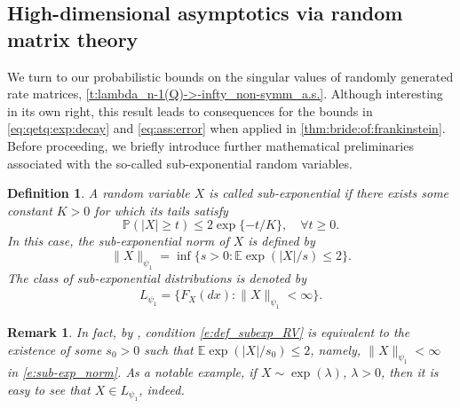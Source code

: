\documentclass[9pt,twocolumn,twoside]{pnas-new}
\makeatletter
\newcommand{\bbP}{{\mathbb P}}
\newcommand{\bbE}{{\mathbb E}}
\newcommand{\?}{\textbf{?}}
\newtheorem{@definition}{\bf Definition}
\newenvironment{definition}{\begin{@definition}\rm}{\end{@definition}}
\newtheorem{@remark}{\bf Remark}
\newenvironment{remark}{\begin{@remark}\rm}{\end{@remark}}
\makeatother
\begin{document}
\subsection*{High-dimensional asymptotics
  via random matrix theory}

We turn to our probabilistic bounds on the singular values of randomly
generated rate matrices, \cref{t:lambda_n-1(Q)->-infty_non-symm_a.s.}.
Although interesting in its own right, this result leads to
consequences for the bounds in \eqref{eq:qetq:exp:decay} and
\eqref{eq:ass:error} when applied in \cref{thm:bride:of:frankinstein}.
Before proceeding, we briefly introduce further mathematical
preliminaries associated with the so-called sub-exponential random
variables.
\begin{definition}
  \label{def:sub:exp:RV}
  A random variable $X$ is called \textit{sub-exponential} if there
  exists some constant $K > 0$ for which its tails satisfy
\begin{equation}\label{e:def_subexp_RV}
\bbP(|X|\geq t) \leq 2 \exp\{-t/K\}, \quad \forall t \geq 0.
\end{equation}
In this case, the \textit{sub-exponential norm} of $X$ is defined by
\begin{equation}\label{e:sub-exp_norm}
\|X\|_{\psi_1} = \inf\big\{s > 0: \bbE \exp(|X|/s) \leq 2\big\}.
\end{equation}
The \textit{class of sub-exponential distributions} is denoted by
\begin{align*}
L_{\psi_1} = \big\{F_X(dx): \|X\|_{\psi_1} < \infty \big\}.
\end{align*}
\end{definition}

\begin{remark}\label{rmk:exp:mom}
  In fact, by \cite[Proposition 2.7.1, p.\ 33]{vershynin:2018},
  condition \eqref{e:def_subexp_RV} is equivalent to the existence of
  some $s_0 > 0$ such that $\bbE \exp(|X|/s_0) \leq 2$, namely,
  $\|X\|_{\psi_1} < \infty$ in \eqref{e:sub-exp_norm}.  As a notable
  example, if $X \sim \exp(\lambda)$, $\lambda > 0$, then it is easy
  to see that $X \in L_{\psi_1}$, indeed.
\end{remark}
\end{document}
